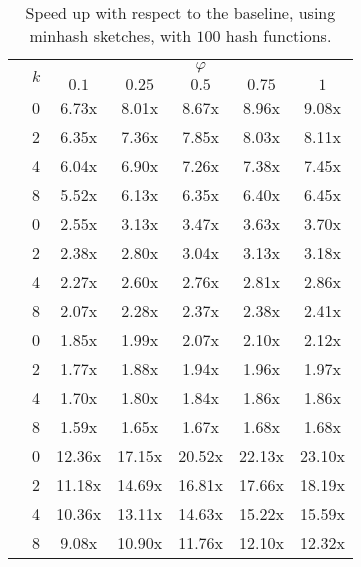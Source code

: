 \begin{table}[ht]
    \centering
    \caption{Speed up with respect to the baseline, using minhash sketches, with $100$ hash functions.}
    \begin{tabular}{ll|ccccc}
    \toprule
        & \multirow{2}{*}{$k$} & \multicolumn{5}{c}{$\varphi$} \\
        & & $0.1$ & $0.25$ & $0.5$ & $0.75$ & $1$\\
    \midrule

    \parbox[t]{2mm}{}
    
    & 0 & 6.73x & 8.01x & 8.67x & 8.96x & 9.08x \\
    & 2 & 6.35x & 7.36x & 7.85x & 8.03x & 8.11x \\
    & 4 & 6.04x & 6.90x & 7.26x & 7.38x & 7.45x \\
    & 8 & 5.52x & 6.13x & 6.35x & 6.40x & 6.45x \\
    
    \midrule[.66pt]
    
    \parbox[t]{2mm}{}
    
    & 0 & 2.55x & 3.13x & 3.47x & 3.63x & 3.70x \\
    & 2 & 2.38x & 2.80x & 3.04x & 3.13x & 3.18x \\
    & 4 & 2.27x & 2.60x & 2.76x & 2.81x & 2.86x \\
    & 8 & 2.07x & 2.28x & 2.37x & 2.38x & 2.41x \\
    
    \midrule[.66pt]
    
    \parbox[t]{2mm}{}
    
    & 0 & 1.85x & 1.99x & 2.07x & 2.10x & 2.12x \\
    & 2 & 1.77x & 1.88x & 1.94x & 1.96x & 1.97x \\
    & 4 & 1.70x & 1.80x & 1.84x & 1.86x & 1.86x \\
    & 8 & 1.59x & 1.65x & 1.67x & 1.68x & 1.68x \\
    
    \midrule[.66pt]
    
    \parbox[t]{2mm}{}
    
    & 0 & 12.36x & 17.15x & 20.52x & 22.13x & 23.10x \\
    & 2 & 11.18x & 14.69x & 16.81x & 17.66x & 18.19x \\
    & 4 & 10.36x & 13.11x & 14.63x & 15.22x & 15.59x \\
    & 8 & 9.08x & 10.90x & 11.76x & 12.10x & 12.32x \\
    

\end{tabular}
\end{table}
